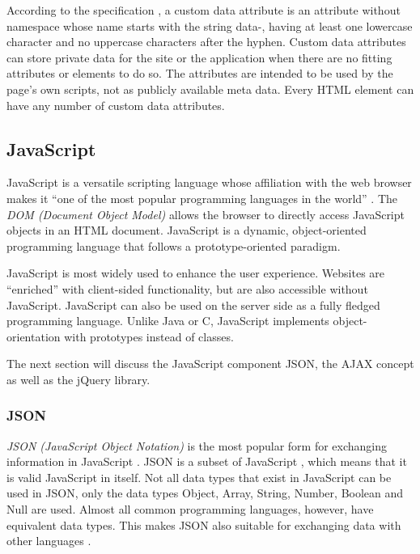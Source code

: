 According to the specification \cite{html5:data}, a custom data attribute is an attribute without namespace whose name starts with the string {\selectfont data-}, having at least one lowercase character and no uppercase characters after the hyphen. Custom data attributes can store private data for the site or the application when there are no fitting attributes or elements to do so. The attributes are intended to be used by the page's own scripts, not as publicly available meta data. Every HTML element can have any number of custom data attributes.


\subsection{JavaScript}

JavaScript is a versatile scripting language whose affiliation with the web browser makes it \enquote{one of the most popular programming languages in the world} . The \textit{DOM (Document Object Model)} \cite{dom:website} allows the browser to directly access JavaScript objects in an HTML document. JavaScript is a dynamic, object-oriented programming language that follows a prototype-oriented paradigm.

JavaScript is most widely used to enhance the user experience. Websites are \enquote{enriched} with client-sided functionality, but are also accessible without JavaScript. JavaScript can also be used on the server side as a fully fledged programming language. Unlike Java or C, JavaScript implements object-orientation with prototypes instead of classes.

The next section will discuss the JavaScript component JSON, the AJAX concept as well as the jQuery library.

\subsubsection{JSON}
\label{subsec:json}

\textit{JSON (JavaScript Object Notation)} is the most popular form for exchanging information in JavaScript . JSON is a subset of JavaScript \cite{json:rfc}, which means that it is valid JavaScript in itself. Not all data types that exist in JavaScript can be used in JSON, only the data types {\selectfont Object}, {\selectfont Array}, {\selectfont String}, {\selectfont Number}, {\selectfont Boolean} and {\selectfont Null} are used. Almost all common programming languages, however, have equivalent data types. This makes JSON also suitable for exchanging data with other languages \cite{json:crockford}.

